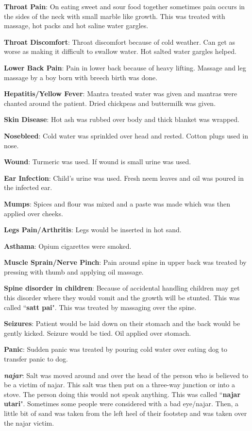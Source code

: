 \textbf{Throat Pain}: On eating sweet and sour food together sometimes pain
occurs in the sides of the neck with small marble like growth. This was treated
with massage, hot packs and hot saline water gargles.

\textbf{Throat Discomfort}: Throat discomfort because of cold weather. Can get
as worse as making it difficult to swallow water. Hot salted water gargles
helped.

\textbf{Lower Back Pain}: Pain in lower back because of heavy lifting. Massage
and leg massage by a boy born with breech birth was done.

\textbf{Hepatitis/Yellow Fever}: Mantra treated water was given and mantras
were chanted around the patient. Dried chickpeas and buttermilk was given.

\textbf{Skin Disease}: Hot ash was rubbed over body and thick blanket was
wrapped.

\textbf{Nosebleed}: Cold water was sprinkled over head and rested. Cotton plugs
used in nose.

\textbf{Wound}: Turmeric was used. If wound is small urine was used.

\textbf{Ear Infection}: Child's urine was used. Fresh neem leaves and oil was
poured in the infected ear.

\textbf{Mumps}: Spices and flour was mixed and a paste was made which was then
applied over cheeks.

\textbf{Legs Pain/Arthritis}: Legs would be inserted in hot sand.

\textbf{Asthama}: Opium cigarettes were smoked.

\textbf{Muscle Sprain/Nerve Pinch}: Pain around spine in upper back was treated
by pressing with thumb and applying oil massage. 

\textbf{Spine disorder in children}: Because of accidental handling children
may get this disorder where they would vomit and the growth will be stunted.
This was called ``\textbf{satt pai}". This was treated by massaging over the
spine.

\textbf{Seizures}: Patient would be laid down on their stomach and the back
would be gently kicked. Seizure would be tied. Oil applied over stomach. 

\textbf{Panic}: Sudden panic was treated by pouring cold water over eating dog
to transfer panic to dog.

\textbf{\textit{najar}}: Salt was moved around and over the head of the person
who is believed to be a victim of najar. This salt was then put on a three-way
junction or into a stove. The person doing this would not speak anything. This
was called ``\textbf{najar utari}". Sometimes some people were considered with
a bad eye/najar. Then, a little bit of sand was taken from the left heel of
their footstep and was taken over the najar victim. 

